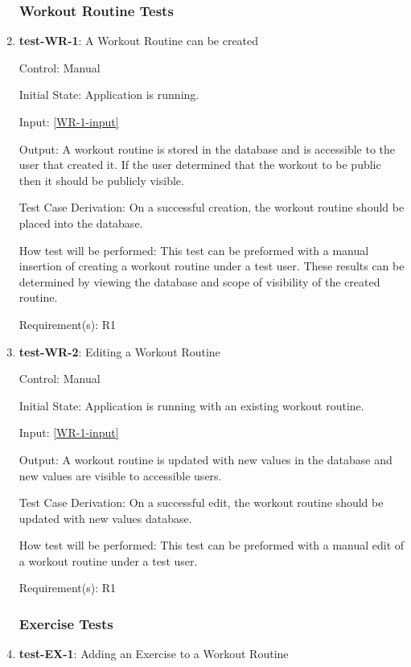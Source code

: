 \documentclass[12pt, titlepage]{article}
\begin{document}
	\begin{enumerate}
		
		\subsubsection{Workout Routine Tests}
		\item{\textbf{test-WR-1}}: A Workout Routine can be created
		
		Control: Manual
		
		Initial State: Application is running.
		
		Input: \ref{WR-1-input}
		
		Output: A workout routine is stored in the database and is accessible to the user that created it. If the user determined that the workout to be public then it should be publicly visible.
		
		Test Case Derivation: On a successful creation, the workout routine should be placed into the database.
		
		How test will be performed: This test can be preformed with a manual insertion of creating a workout routine under a test user. These results can be determined by viewing the database and scope of visibility of the created routine.
		
		Requirement(s): R1
		
		\item{\textbf{test-WR-2}}: Editing a Workout Routine
		
		Control: Manual
		
		Initial State: Application is running with an existing workout routine.
		
		Input: \ref{WR-1-input}
		
		Output: A workout routine is updated with new values in the database and new values are visible to accessible users.
		
		Test Case Derivation: On a successful edit, the workout routine should be updated with new values database.
		
		How test will be performed: This test can be preformed with a manual edit of a workout routine under a test user.
		
		Requirement(s): R1
		
		\subsubsection{Exercise Tests}
		\item{\textbf{test-EX-1}}: Adding an Exercise to a Workout Routine


\end{enumerate}
\end{document}
